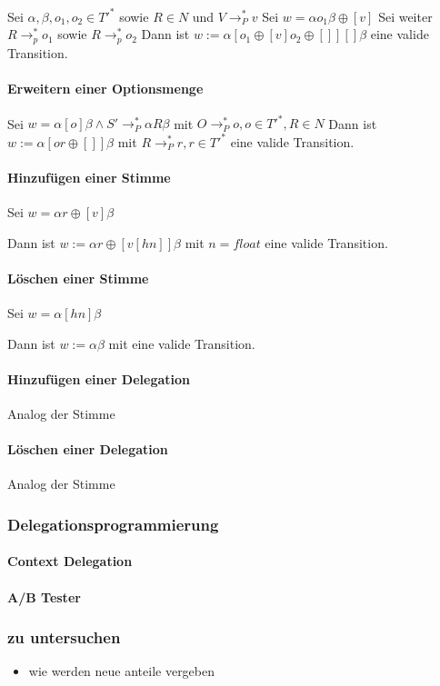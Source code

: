\documentclass[]{article}
\begin{document}
Sei $\alpha,\beta,o_1,o_2 \in T'^*$ sowie $R\in N$ und
$V \rightarrow_P^* v$ Sei $w=\alpha o_1 \beta \oplus [v]$ Sei weiter
$R\rightarrow_p^* o_1$ sowie $R\rightarrow_p^* o_2$ Dann ist
$w:=\alpha [o_1\oplus [v] o_2\oplus []][]\beta$ eine valide Transition.

\paragraph{Erweitern einer Optionsmenge}

Sei $w=\alpha[o]\beta \land S'\rightarrow_P^* \alpha R \beta$ mit
$O\rightarrow_P^* o, o\in T'^*, R\in N$ Dann ist
$w:=\alpha[o r\oplus []]\beta$ mit $R \rightarrow_P^* r, r\in T'^*$ eine
valide Transition.

\paragraph{Hinzufügen einer Stimme}

Sei $w=\alpha r\oplus [v]\beta$

Dann ist $w:=\alpha r \oplus [v[h n]]\beta$ mit $n=float$ eine valide
Transition.

\paragraph{Löschen einer Stimme}

Sei $w=\alpha [hn]\beta$

Dann ist $w:=\alpha\beta$ mit eine valide Transition.

\paragraph{Hinzufügen einer Delegation}
Analog der Stimme

\paragraph{Löschen einer Delegation}
Analog der Stimme

\subsubsection{Delegationsprogrammierung}

\paragraph{Context Delegation}
\paragraph{A/B Tester}

\subsubsection{zu untersuchen}

\begin{itemize}
\itemsep1pt\parskip0pt
\item
  wie werden neue anteile vergeben
\end{itemize}


% 

\end{document}
